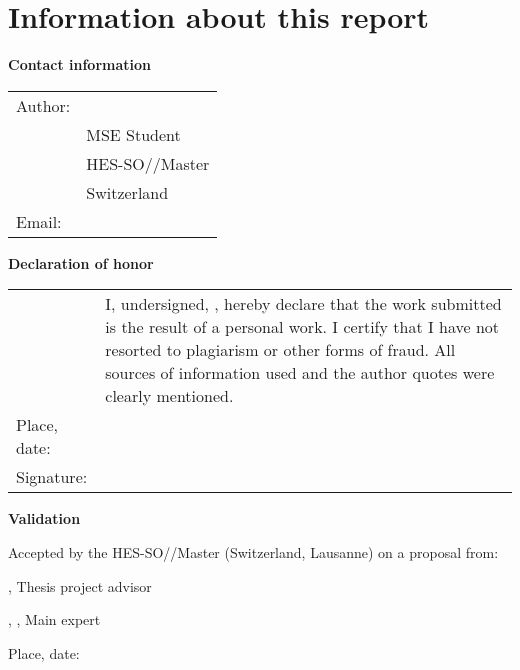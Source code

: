\setlength{\parindent}{0pt}

\chapter*{Information about this report}

\vspace{\fill}

\textbf{Contact information}

\begin{tabularx}{\textwidth}{N{2.5cm}X}
	Author:	 & \AuthorFirstName \AuthorLastName \\
	& MSE Student \\
	& HES-SO//Master \\
	& Switzerland \\
	Email: & \email{\AuthorEmail}
\end{tabularx}

\vspace{\fill}

\textbf{Declaration of honor}

{\renewcommand{\arraystretch}{2}
\begin{tabularx}{\textwidth}{N{2.5cm}X}
	& I, undersigned, \Author, hereby declare that the work submitted is
	the result of a personal work. I certify that I have not resorted to
	plagiarism or other forms of fraud. All sources of information used and the
	author quotes were clearly mentioned. \\
	Place, date: & \underline{\hspace{7cm}} \\
	Signature: & \underline{\hspace{7cm}}
\end{tabularx}
}

\vspace{\fill}

\textbf{Validation}

Accepted by the HES-SO//Master (Switzerland, Lausanne) on a proposal from:

\vspace{0.5cm}

\Advisor, Thesis project advisor

\Expert, \ExpertLab, Main expert

\vspace{1cm}

Place, date: \underline{\hspace{8cm}}

\vspace{3cm}

